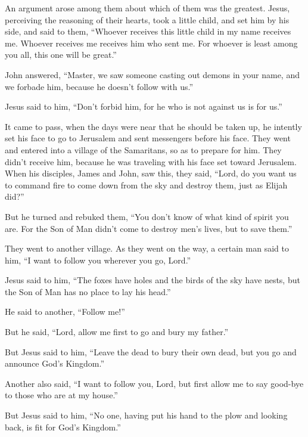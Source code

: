  An argument arose among them about which of them was the
greatest.  Jesus, perceiving the reasoning of their
hearts, took a little child, and set him by his side, 
and said to them, ``Whoever receives this little child in my name
receives me. Whoever receives me receives him who sent me. For whoever
is least among you all, this one will be great.''

 John answered, ``Master, we saw someone casting out
demons in your name, and we forbade him, because he doesn't follow with
us.''

 Jesus said to him, ``Don't forbid him, for he who is not
against us is for us.''

 It came to pass, when the days were near that he should
be taken up, he intently set his face to go to Jerusalem 
and sent messengers before his face. They went and entered into a
village of the Samaritans, so as to prepare for him. 
They didn't receive him, because he was traveling with his face set
toward Jerusalem.  When his disciples, James and John,
saw this, they said, ``Lord, do you want us to command fire to come down
from the sky and destroy them, just as Elijah did?''

 But he turned and rebuked them, ``You don't know of what
kind of spirit you are.  For the Son of Man didn't come
to destroy men's lives, but to save them.''

They went to another village.  As they went on the way, a
certain man said to him, ``I want to follow you wherever you go, Lord.''

 Jesus said to him, ``The foxes have holes and the birds
of the sky have nests, but the Son of Man has no place to lay his
head.''

 He said to another, ``Follow me!''

But he said, ``Lord, allow me first to go and bury my father.''

 But Jesus said to him, ``Leave the dead to bury their
own dead, but you go and announce God's Kingdom.''

 Another also said, ``I want to follow you, Lord, but
first allow me to say good-bye to those who are at my house.''

 But Jesus said to him, ``No one, having put his hand to
the plow and looking back, is fit for God's Kingdom.''

